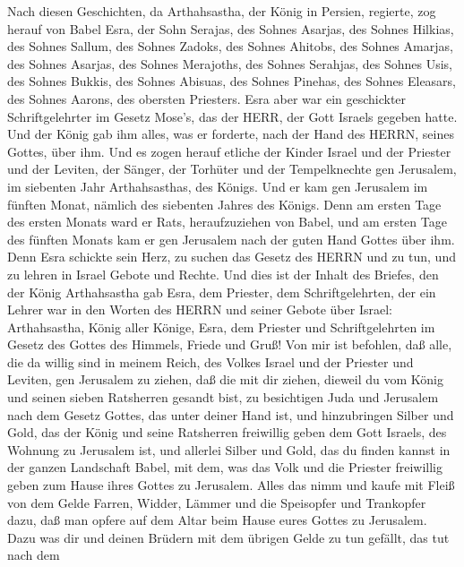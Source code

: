  Nach diesen Geschichten, da Arthahsastha, der König in
Persien, regierte, zog herauf von Babel Esra, der Sohn Serajas, des
Sohnes Asarjas, des Sohnes Hilkias,  des Sohnes Sallum, des
Sohnes Zadoks, des Sohnes Ahitobs,  des Sohnes Amarjas, des
Sohnes Asarjas, des Sohnes Merajoths,  des Sohnes Serahjas,
des Sohnes Usis, des Sohnes Bukkis,  des Sohnes Abisuas, des
Sohnes Pinehas, des Sohnes Eleasars, des Sohnes Aarons, des obersten
Priesters.  Esra aber war ein geschickter Schriftgelehrter
im Gesetz Mose's, das der HERR, der Gott Israels gegeben hatte. Und der
König gab ihm alles, was er forderte, nach der Hand des HERRN, seines
Gottes, über ihm.  Und es zogen herauf etliche der Kinder
Israel und der Priester und der Leviten, der Sänger, der Torhüter und
der Tempelknechte gen Jerusalem, im siebenten Jahr Arthahsasthas, des
Königs.  Und er kam gen Jerusalem im fünften Monat, nämlich
des siebenten Jahres des Königs.  Denn am ersten Tage des
ersten Monats ward er Rats, heraufzuziehen von Babel, und am ersten Tage
des fünften Monats kam er gen Jerusalem nach der guten Hand Gottes über
ihm.  Denn Esra schickte sein Herz, zu suchen das Gesetz
des HERRN und zu tun, und zu lehren in Israel Gebote und Rechte.
 Und dies ist der Inhalt des Briefes, den der König
Arthahsastha gab Esra, dem Priester, dem Schriftgelehrten, der ein
Lehrer war in den Worten des HERRN und seiner Gebote über Israel:
 Arthahsastha, König aller Könige, Esra, dem Priester und
Schriftgelehrten im Gesetz des Gottes des Himmels, Friede und Gruß!
 Von mir ist befohlen, daß alle, die da willig sind in
meinem Reich, des Volkes Israel und der Priester und Leviten, gen
Jerusalem zu ziehen, daß die mit dir ziehen,  dieweil du
vom König und seinen sieben Ratsherren gesandt bist, zu besichtigen Juda
und Jerusalem nach dem Gesetz Gottes, das unter deiner Hand ist,
 und hinzubringen Silber und Gold, das der König und seine
Ratsherren freiwillig geben dem Gott Israels, des Wohnung zu Jerusalem
ist,  und allerlei Silber und Gold, das du finden kannst in
der ganzen Landschaft Babel, mit dem, was das Volk und die Priester
freiwillig geben zum Hause ihres Gottes zu Jerusalem. 
Alles das nimm und kaufe mit Fleiß von dem Gelde Farren, Widder, Lämmer
und die Speisopfer und Trankopfer dazu, daß man opfere auf dem Altar
beim Hause eures Gottes zu Jerusalem.  Dazu was dir und
deinen Brüdern mit dem übrigen Gelde zu tun gefällt, das tut nach dem
